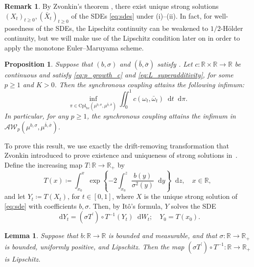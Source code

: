 \documentclass[oneside]{amsart}
\newtheorem{proposition}[theorem]{Proposition}
\newtheorem{lemma}[theorem]{Lemma}
\theoremstyle{definition}
\newtheorem{remark}[theorem]{Remark}
\newcommand{\AW}{\mathcal A\mathcal W}
\newcommand{\R}{\mathbb R}
\newcommand{\cplbc}{\mathrm{Cpl}_{\mathrm{bc}}}
\newcommand{\D}{\mathop{}\!\mathrm{d}}
\newcommand{\dt}{\mathop{}\!\mathrm{d}t}
\newcommand{\di}{\mathop{}\!\mathrm{d}}
\def\R{{\mathbb R}}
\numberwithin{equation}{section}
\begin{document}
\begin{remark}
	By Zvonkin's theorem \cite{Zv74}, there exist unique strong solutions $(X_t)_{t \geq 0}, (\bar X_t)_{t \geq 0}$ of the SDEs \eqref{eq:sdes} under  (i)--(ii). In fact, for well-posedness of the SDEs, the Lipschitz continuity can be weakened to $1/2$-H\"older continuity, but we will make use of the Lipschitz condition later on in order to apply the monotone Euler--Maruyama scheme.	
\end{remark}


\begin{proposition}\label{prop:zvonkin}
		Suppose that $(b, \sigma)$ and $(\bar b, \bar \sigma)$ satisfy .
		Let $c \colon \mathbb R\times \mathbb R \to\mathbb R$ be continuous and satisfy \eqref{eq:p_growth_c} and \eqref{eq:L_superadditivity}, for some $p \ge 1$ and $K>0$. 
		Then the synchronous coupling attains the following infimum:
		\[
\inf_{\pi\in\cplbc(\mu^{b,\sigma},\mu^{\bar b,\bar\sigma})}\iint_0^1c\!\left(\omega_t,\bar{\omega}_t\right)\dt\di\pi.
\]
In particular, for any $p \ge 1$, the synchronous coupling attains the infimum in $\AW_p(\mu^{b,\sigma},\mu^{\bar b,\bar\sigma})$.
	\end{proposition}	
	

To prove this result, we use exactly the drift-removing transformation
that Zvonkin introduced to prove existence and uniqueness of
strong solutions in~\cite{Zv74}. Define the increasing map $T\colon \R \to \R_+$ by
\begin{equation}
	T(x)\coloneqq  \int_{x_0}^x\exp\!\left\{- 2 \int_{x_0}^z \frac{b(y)}{\sigma^2(y)} \D y \right\}\D z, \quad x \in \R,
\end{equation}
and let $Y_t\coloneqq  T(X_t)$, for $t \in [0, 1]$, where $X$ is the unique strong solution of \eqref{eq:sde} with coefficients $b, \sigma$. Then, by It\^o's formula, $Y$ solves the SDE
\begin{equation}\label{eq:sde-transformed}
	\D Y_t = (\sigma T^\prime) \circ T^{-1}(Y_t) \D W_t; \quad Y_0 = T(x_0).
\end{equation}


\begin{lemma}\label{lem:zvonkin-lipschitz}
	Suppose that $b \colon \R \to \R$ is bounded and measurable, and that $\sigma \colon \R \to \R_+$ is bounded, uniformly positive, and Lipschitz. Then the map $(\sigma T^\prime) \circ T^{-1} \colon \R \to \R_+$ is Lipschitz.
\end{lemma}
\end{document}
